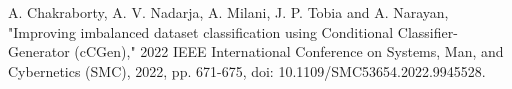 

\vspace{2mm}
\begin{cvitems}
\item A. Chakraborty, A. V. Nadarja, A. Milani, J. P. Tobia and A. Narayan, "Improving imbalanced dataset classification using Conditional Classifier-Generator (cCGen)," 2022 IEEE International Conference on Systems, Man, and Cybernetics (SMC), 2022, pp. 671-675, doi: 10.1109/SMC53654.2022.9945528.
\end{cvitems}